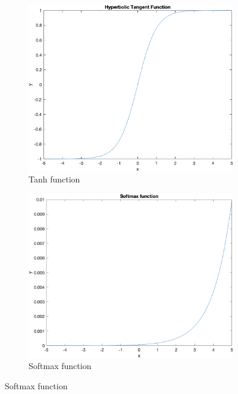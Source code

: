 \begin{figure}
\begin{subfigure}[b]{0.4\textwidth}
    \end{subfigure}
    \begin{subfigure}[b]{0.4\textwidth}
        \includegraphics[width=\textwidth]{figures/tanh}
        \caption{Tanh function}
        \label{fig:tahn}
    \end{subfigure}
    \hspace{0.1\textwidth}
    \begin{subfigure}[b]{0.4\textwidth}
        \includegraphics[width=\textwidth]{figures/softmax}
        \caption{Softmax function}
        \label{fig:sigmsoftmaxoid}
    \end{subfigure}

\end{figure}
